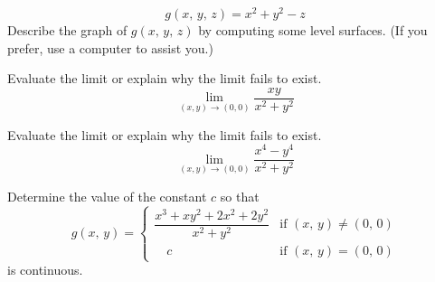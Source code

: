 \documentclass[12pt,letterpaper]{hmcpset}
\begin{document}
\begin{solution}
\vfill
\end{solution}
\newpage

\begin{problem}[2.1.33]
  $$g(x,\,y,\,z) = x^2 + y^2 - z$$
  Describe the graph of $g(x,\,y,\,z)$ by computing some level surfaces. (If you prefer, use a computer to assist you.)
\end{problem}

\begin{solution}
\vfill
\end{solution}
\newpage

\begin{problem}[2.2.14]
  Evaluate the limit or explain why the limit fails to exist.
  \[
    \lim_{(x,y)\to(0,0)} \dfrac{xy}{x^2+y^2}
  \]
\end{problem}

\begin{solution}
\vfill
\end{solution}
\newpage

\begin{problem}[2.2.15]
  Evaluate the limit or explain why the limit fails to exist.
  \[
    \lim_{(x,y)\to(0,0)} \dfrac{x^4 - y^4}{x^2+y^2}
  \]
\end{problem}

\begin{solution}
\vfill
\end{solution}
\newpage

\begin{problem}[2.2.46]
  Determine the value of the constant $c$ so that
  \[
    g(x,\,y) = \begin{cases}
    \dfrac{x^3 + xy^2 + 2x^2 + 2y^2}{x^2+y^2} & \text{if }(x,\,y) \neq (0,\,0)\\
    \quad c & \text{if } (x,\,y) = (0,\,0)
  \end{cases}
  \]
  is continuous.
\end{problem}

\begin{solution}
\vfill
\end{solution}
\end{document}
